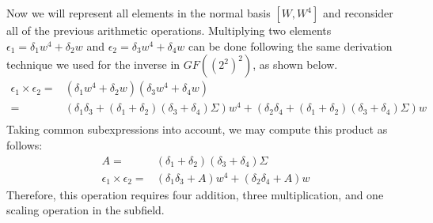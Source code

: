 Now we will represent all elements in the normal basis $[W, W^4]$ and reconsider all of the previous arithmetic operations. Multiplying two elements $\epsilon_1 = \delta_1 w^4 + \delta_2 w$ and $\epsilon_2 = \delta_3 w^4 + \delta_4 w$ can be done following the same derivation technique we used for the inverse in $GF((2^2)^2)$, as shown below.
\begin{align*}
\epsilon_1 \times \epsilon_2 = & (\delta_1 w^4 + \delta_2 w)(\delta_3 w^4 + \delta_4 w) \\
= & (\delta_1\delta_3 + (\delta_1 + \delta_2)(\delta_3 + \delta_4)\Sigma) w^4 + (\delta_2\delta_4 + (\delta_1 + \delta_2)(\delta_3 + \delta_4)\Sigma) w \\
\end{align*}
Taking common subexpressions into account, we may compute this product as follows:
\begin{align*}
A = & (\delta_1 + \delta_2)(\delta_3 + \delta_4)\Sigma \\
\epsilon_1 \times \epsilon_2 = & (\delta_1\delta_3 + A) w^4 + (\delta_2\delta_4 + A) w
\end{align*}
Therefore, this operation requires four addition, three multiplication, and one scaling operation in the subfield.

